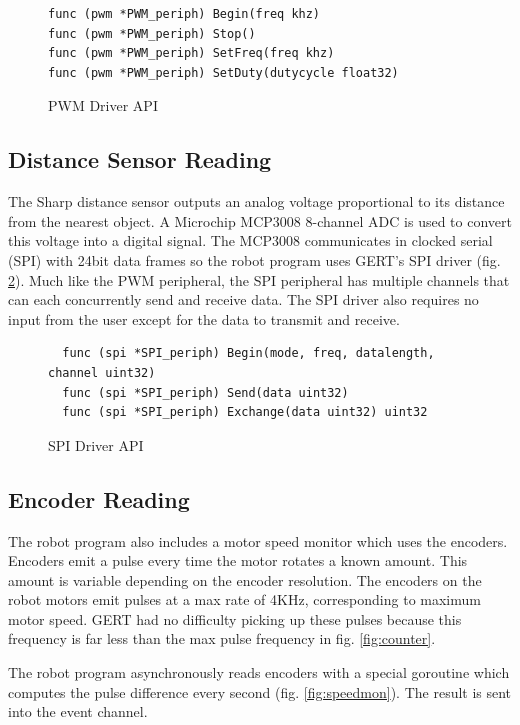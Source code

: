 \begin{figure}[h]
  \begin{lstlisting}
func (pwm *PWM_periph) Begin(freq khz)
func (pwm *PWM_periph) Stop()
func (pwm *PWM_periph) SetFreq(freq khz)
func (pwm *PWM_periph) SetDuty(dutycycle float32)
  \end{lstlisting}
  \caption{PWM Driver API} \label{fig:pwm_api}
\end{figure}

\subsection{Distance Sensor Reading}
The Sharp distance sensor outputs an analog voltage proportional to its distance from the nearest object.
A Microchip MCP3008 8-channel ADC is used to convert this voltage into a digital signal. The MCP3008 communicates in clocked
serial (SPI) with 24bit data frames so the robot program uses GERT's SPI driver (fig. \ref{fig:spi_api}). Much like the
PWM peripheral, the SPI peripheral has multiple channels that can each concurrently send and receive data. The SPI
driver also requires no input from the user except for the data to transmit and receive.

\begin{figure}[h]
  \begin{lstlisting}
  func (spi *SPI_periph) Begin(mode, freq, datalength, channel uint32)
  func (spi *SPI_periph) Send(data uint32)
  func (spi *SPI_periph) Exchange(data uint32) uint32
  \end{lstlisting}
  \caption{SPI Driver API} \label{fig:spi_api}
\end{figure}


\subsection{Encoder Reading}
The robot program also includes a motor speed monitor which uses the encoders.
Encoders emit a pulse every time the motor rotates a known amount. This amount is variable depending on the
encoder resolution. The encoders on the robot motors emit pulses at a max rate of 4KHz, corresponding to
maximum motor speed. GERT had no difficulty picking up these pulses because this frequency is far less than
the max pulse frequency in fig. \ref{fig:counter}.

The robot program asynchronously reads encoders with a special goroutine which computes the pulse difference
every second (fig. \ref{fig:speedmon}). The result is sent into the event channel.

